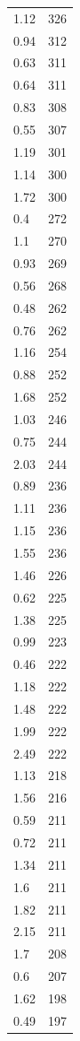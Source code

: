 \begin{table}[ht]
\begin{tabular}{lr}
  1.12 & 326 \\ 
  0.94 & 312 \\ 
  0.63 & 311 \\ 
  0.64 & 311 \\ 
  0.83 & 308 \\ 
  0.55 & 307 \\ 
  1.19 & 301 \\ 
  1.14 & 300 \\ 
  1.72 & 300 \\ 
  0.4 & 272 \\ 
  1.1 & 270 \\ 
  0.93 & 269 \\ 
  0.56 & 268 \\ 
  0.48 & 262 \\ 
  0.76 & 262 \\ 
  1.16 & 254 \\ 
  0.88 & 252 \\ 
  1.68 & 252 \\ 
  1.03 & 246 \\ 
  0.75 & 244 \\ 
  2.03 & 244 \\ 
  0.89 & 236 \\ 
  1.11 & 236 \\ 
  1.15 & 236 \\ 
  1.55 & 236 \\ 
  1.46 & 226 \\ 
  0.62 & 225 \\ 
  1.38 & 225 \\ 
  0.99 & 223 \\ 
  0.46 & 222 \\ 
  1.18 & 222 \\ 
  1.48 & 222 \\ 
  1.99 & 222 \\ 
  2.49 & 222 \\ 
  1.13 & 218 \\ 
  1.56 & 216 \\ 
  0.59 & 211 \\ 
  0.72 & 211 \\ 
  1.34 & 211 \\ 
  1.6 & 211 \\ 
  1.82 & 211 \\ 
  2.15 & 211 \\ 
  1.7 & 208 \\ 
  0.6 & 207 \\ 
  1.62 & 198 \\ 
  0.49 & 197 \\ 

\end{tabular}
\end{table}
